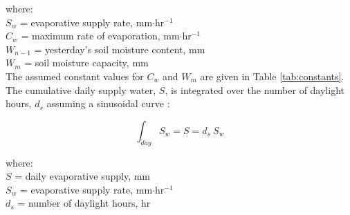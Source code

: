 \noindent where: \\
\indent $S_w$ = evaporative supply rate, mm$\cdot$hr$^{-1}$\\
\indent $C_w$ = maximum rate of evaporation, mm$\cdot$hr$^{-1}$\\
\indent $W_{n-1}$ = yesterday's soil moisture content, mm\\
\indent $W_m$ = soil moisture capacity, mm\\

\noindent The assumed constant values for $C_w$ and $W_m$ are given in Table \ref{tab:constants}. 
The cumulative daily supply water, $S$, is integrated over the number of daylight hours, $d_s$ assuming a sinusoidal curve \parencite[Eq. 18b]{federer82}:

\begin{equation}
\label{eq:sd}
    \int_{day} S_{w} = S = d_s\: S_w
\end{equation}

\noindent where: \\
\indent $S$ = daily evaporative supply, mm\\
\indent $S_{w}$ = evaporative supply rate, mm$\cdot$hr$^{-1}$\\
\indent $d_s$ = number of daylight hours, hr\\

